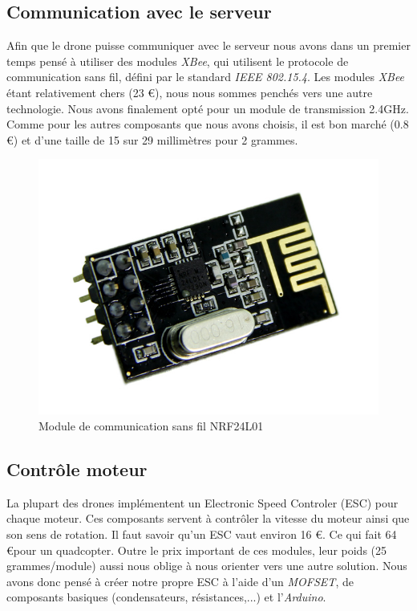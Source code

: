 \documentclass[a4paper,10pt]{report}
\begin{document}
      \subsection{Communication avec le serveur}
	Afin que le drone puisse communiquer avec le serveur nous avons dans un premier temps pensé à utiliser des modules \textit{XBee}, 
	qui utilisent le protocole de communication sans fil, défini par le standard \textit{IEEE 802.15.4}. Les modules \textit{XBee} 
	étant relativement chers (23 \euro), nous nous sommes penchés vers une autre technologie. Nous avons finalement opté pour un module
	de transmission 2.4GHz. Comme pour les autres composants que nous avons choisis, il est bon marché (0.8 \euro) et d'une taille de 15 
	sur 29 millimètres pour 2 grammes.
	
	\begin{figure}[htbp]%
	  \centering
	  \includegraphics[scale = 0.35]{img/nrf24l01.jpg}
	  \caption{Module de communication sans fil NRF24L01}
	  \label{nrf24l01}
	\end{figure}
      
      \subsection{Contrôle moteur}
	La plupart des drones implémentent un Electronic Speed Controler (ESC) pour chaque moteur. Ces composants servent à contrôler 
	la vitesse du moteur ainsi que son sens de rotation. Il faut savoir qu'un ESC vaut environ 16 \euro. Ce qui fait 64 \euro pour 
	un quadcopter. Outre le prix important de ces modules, leur poids (25 grammes/module) aussi nous oblige à nous orienter vers 
	une autre solution. Nous avons donc pensé à créer notre propre ESC à l’aide d’un \textit{MOFSET}, de composants basiques 
	(condensateurs, résistances,...) et l’\textit{Arduino}.
	
\end{document}
